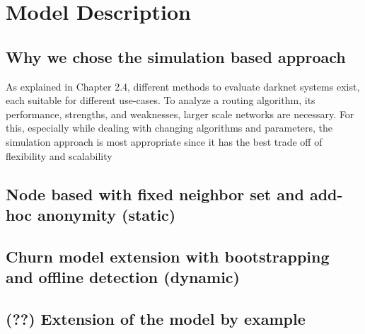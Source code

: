 \chapter{Model Description}

\section{Why we chose the simulation based approach}

As explained in Chapter 2.4, different methods to evaluate darknet systems exist, each suitable for different use-cases. To analyze a routing algorithm, its performance, strengths, and weaknesses, larger scale networks are necessary. For this, especially while dealing with changing algorithms and parameters, the simulation approach is most appropriate since it has the best trade off of flexibility and scalability

\section{Node based with fixed neighbor set and add-hoc anonymity (static)}



\section{Churn model extension with bootstrapping and offline detection (dynamic)}
\section{(??) Extension of the model by example}
